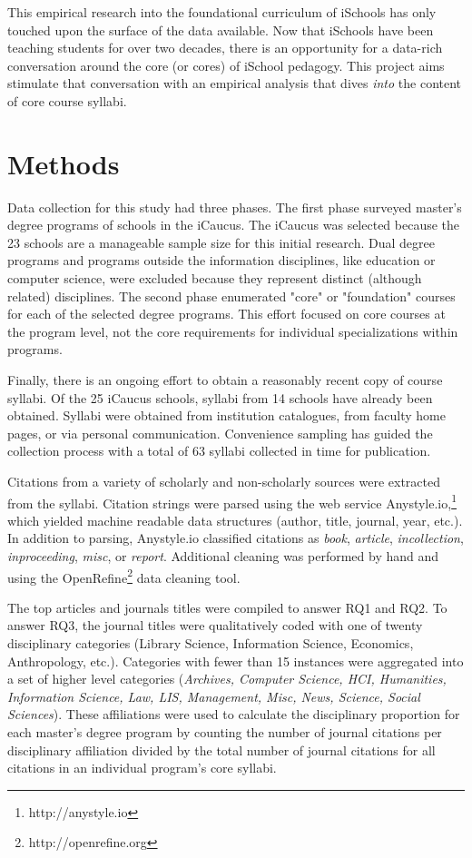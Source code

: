 \documentclass[10pt, letterpaper]{article}
\begin{document}
This empirical research into the foundational curriculum of iSchools has only touched upon the surface of the data available. Now that iSchools have been teaching students for over two decades, there is an opportunity for a data-rich conversation around the core (or cores) of iSchool pedagogy. This project aims stimulate that conversation with an empirical analysis that dives \textit{into} the content of core course syllabi. 

\section{Methods}
Data collection for this study had three phases. The first phase surveyed master's degree programs of schools in the iCaucus. The iCaucus was selected because the 23 schools are a manageable sample size for this initial research. Dual degree programs and programs outside the information disciplines, like education or computer science, were excluded because they represent distinct (although related) disciplines. The second phase enumerated "core" or "foundation" courses for each of the selected degree programs. This effort focused on core courses at the program level, not the core requirements for individual specializations within programs. 

Finally, there is an ongoing effort to obtain a reasonably recent copy of course syllabi. Of the 25 iCaucus schools, syllabi from 14 schools have already been obtained. Syllabi were obtained from institution catalogues, from faculty home pages, or via personal communication. Convenience sampling has guided the collection process with a total of 63 syllabi collected in time for publication.

Citations from a variety of scholarly and non-scholarly sources were extracted from the syllabi. Citation strings were parsed using the web service Anystyle.io,\footnote{http://anystyle.io} which yielded machine readable data structures (author, title, journal, year, etc.). In addition to parsing, Anystyle.io classified citations as \textit{book}, \textit{article}, \textit{incollection}, \textit{inproceeding}, \textit{misc}, or \textit{report}. Additional cleaning was performed by hand and using the OpenRefine\footnote{http://openrefine.org} data cleaning tool.

The top articles and journals titles were compiled to answer RQ1 and RQ2. To answer RQ3, the journal titles were qualitatively coded with one of twenty disciplinary categories (Library Science, Information Science, Economics, Anthropology, etc.). Categories with fewer than 15 instances were aggregated into a set of higher level categories (\textit{Archives, Computer Science, HCI, Humanities, Information Science, Law, LIS, Management, Misc, News, Science, Social Sciences}). These affiliations were used to calculate the disciplinary proportion for each master's degree program by counting the number of journal citations per disciplinary affiliation divided by the total number of journal citations for all citations in an individual program's core syllabi.
\end{document}
